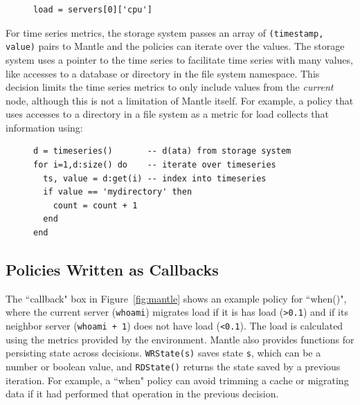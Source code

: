\begin{figure}[h]
\footnotesize
\begin{verbatim}
load = servers[0]['cpu']
\end{verbatim}
\end{figure}

For time series metrics, the storage system passes an array of \texttt{(timestamp,
value)} pairs to Mantle and the policies can iterate over the values. The
storage system uses a pointer to the time series to facilitate time series with many
values, like accesses to a database or directory in the file system namespace.
This decision limits the time series metrics to only include values from the
{\it current} node, although this is not a limitation of Mantle itself.  For
example, a policy that uses accesses to a directory in a file system as a
metric for load collects that information using:\\

\begin{figure}[h]
\footnotesize
\begin{verbatim}
d = timeseries()       -- d(ata) from storage system
for i=1,d:size() do    -- iterate over timeseries
  ts, value = d:get(i) -- index into timeseries 
  if value == 'mydirectory' then
    count = count + 1
  end
end
\end{verbatim}
\end{figure}



\subsection{Policies Written as Callbacks} The ``callback" box in
Figure~\ref{fig:mantle} shows an example policy for ``when()", where the
current server (\texttt{whoami}) migrates load if it is has load
(\texttt{>0.1}) and if its neighbor server (\texttt{whoami + 1}) does not have
load (\texttt{<0.1}). The load is calculated using the metrics provided by the
environment. Mantle also provides functions for persisting state across decisions.
\texttt{WRState(s)} saves state \texttt{s}, which can be a number or boolean
value, and \texttt{RDState()} returns the state saved by a previous iteration.
For example, a ``when" policy can avoid trimming a cache or migrating data if
it had performed that operation in the previous decision.



